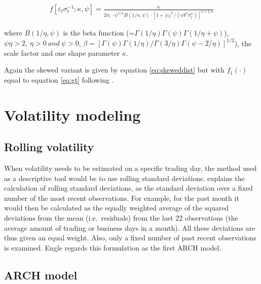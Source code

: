 \documentclass[a4paper, twoside]{templates/ociamthesis}
\begin{document}
\begin{align}
f\left[\varepsilon_{t} \sigma_{t}^{-1} ; \kappa, \psi\right]=\frac{\kappa}{2 \sigma_{t} \ \cdot \psi^{1 / \kappa} B(1 / \kappa, \psi) \cdot\left[1+\left|\varepsilon_{t}\right|^{\kappa} /\left(\psi b^{\kappa} \sigma_{t}^{\kappa}\right)\right]^{\psi+1 / \kappa}}
 \label{eq:gt}
\end{align}

where \(B(1 / \eta, \psi)\) is the beta function (=\(\Gamma(1 / \eta) \Gamma(\psi) \Gamma(1 / \eta+\psi)\)), \(\psi\eta>2,\ \eta>0 \ and \ \psi >0\), \(\beta = [\Gamma(\psi)\Gamma(1 / \eta)/\Gamma(3 / \eta)\Gamma(\psi - 2/\eta)]^{1/2}\)), the scale factor and one shape parameter \(\kappa\).

Again the skewed variant is given by equation \eqref{eq:skeweddist} but with \(f_1(\cdot)\) equal to equation \eqref{eq:gt} following \textcite{trottier2015}.

\hypertarget{vol-mod}{%
\section{Volatility modeling}\label{vol-mod}}

\hypertarget{rolling-volatility}{%
\subsection{Rolling volatility}\label{rolling-volatility}}

When volatility needs to be estimated on a specific trading day, the method used as a descriptive tool would be to use rolling standard deviations. \textcite{engle2001} explains the calculation of rolling standard deviations, as the standard deviation over a fixed number of the most recent observations. For example, for the past month it would then be calculated as the equally weighted average of the squared deviations from the mean (i.e.~residuals) from the last 22 observations (the average amount of trading or business days in a month). All these deviations are thus given an equal weight. Also, only a fixed number of past recent observations is examined. Engle regards this formulation as the first ARCH model.

\newpage

\hypertarget{arch-model}{%
\subsection{ARCH model}\label{arch-model}}
\end{document}

